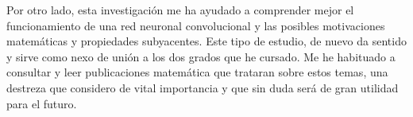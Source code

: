 \medskip

\noindent Por otro lado, esta investigación me ha ayudado a comprender mejor el funcionamiento de una red neuronal convolucional y las posibles motivaciones matemáticas y propiedades subyacentes. Este tipo de estudio, de nuevo da sentido y sirve como nexo de unión a los dos grados que he cursado. Me he habituado a consultar y leer publicaciones matemática que trataran sobre estos temas, una destreza que considero de vital importancia y que sin duda será de gran utilidad para el futuro.

\endinput